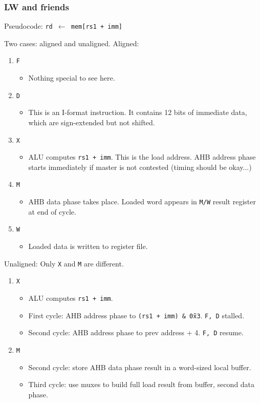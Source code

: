 \documentclass{article}
\begin{document}
\subsubsection{LW and friends}

Pseudocode: \texttt{rd $\leftarrow$ mem[rs1 + imm]}

Two cases: aligned and unaligned. Aligned:


\begin{enumerate}
	\item \texttt{F}
	\begin{itemize}
		\item Nothing special to see here.
	\end{itemize}
	\item \texttt{D}
	\begin{itemize}
		\item This is an I-format instruction. It contains 12 bits of immediate data, which are sign-extended but not shifted.
	\end{itemize}
	\item \texttt{X}
	\begin{itemize}
		\item ALU computes \texttt{rs1 + imm}. This is the load address. AHB address phase starts immediately if master is not contested (timing should be okay...)
	\end{itemize}
	\item \texttt{M}
	\begin{itemize}
		\item AHB data phase takes place. Loaded word appears in \texttt{M/W} result register at end of cycle.
	\end{itemize}
	\item \texttt{W}
	\begin{itemize}
		\item Loaded data is written to register file.
	\end{itemize}
\end{enumerate}

Unaligned: Only \texttt{X} and \texttt{M} are different.

\begin{enumerate}
	\item \texttt{X}
	\begin{itemize}
		\item ALU computes \texttt{rs1 + imm}.
		\item First cycle: AHB address phase to \texttt{(rs1 + imm) \& \~0x3}. \texttt{F, D} stalled.
		\item Second cycle: AHB address phase to prev address + 4. \texttt{F, D} resume.
	\end{itemize}
	\item \texttt{M}
	\begin{itemize}
		\item Second cycle: store AHB data phase result in a word-sized local buffer.
		\item Third cycle: use muxes to build full load result from buffer, second data phase.
	\end{itemize}
\end{enumerate}
\end{document}

